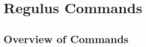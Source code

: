 \chapter{Regulus Commands}
\label{Chapter:RegulusCommands}

\author{Manny Rayner}

\section{Overview of Commands}
\label{Section:CommandsOverview}

